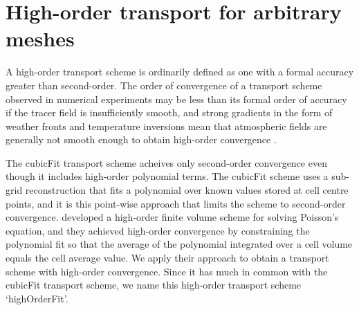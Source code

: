 \chapter{High-order transport for arbitrary meshes}
\label{ch:highOrder}


A high-order transport scheme is ordinarily defined as one with a formal accuracy greater than second-order.
The order of convergence of a transport scheme observed in numerical experiments may be less than its formal order of accuracy if the tracer field  is insufficiently smooth, and strong gradients in the form of weather fronts and temperature inversions mean that atmospheric fields are generally not smooth enough to obtain high-order convergence \citep{holdaway2008}. 

The cubicFit transport scheme acheives only second-order convergence even though it includes high-order polynomial terms.  The cubicFit scheme uses a sub-grid reconstruction that fits a polynomial over known values stored at cell centre points, and it is this point-wise approach that limits the scheme to second-order convergence.
\citet{devendran2017} developed a high-order finite volume scheme for solving Poisson’s equation, and they achieved high-order convergence by constraining the polynomial fit so that the average of the polynomial integrated over a cell volume equals the cell average value.
We apply their approach to obtain a transport scheme with high-order convergence.
Since it has much in common with the cubicFit transport scheme, we name this high-order transport scheme `highOrderFit'.

